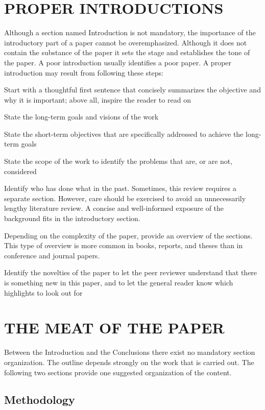 \documentclass{ICASP13Paper}
\begin{document}
\section{PROPER INTRODUCTIONS}
Although a section named Introduction is not mandatory, the importance of the 
introductory part of a paper cannot be overemphasized. Although it does not 
contain the substance of the paper it sets the stage and establishes the tone 
of the paper. A poor introduction usually identifies a poor paper. A proper 
introduction may result from following these steps:
\begin{compactenum}
  \item Start with a thoughtful first sentence that concisely summarizes the 
  objective and why it is important; above all, inspire the reader to read on
  \item State the long-term goals and visions of the work
  \item State the short-term objectives that are specifically addressed to 
  achieve the long-term goals
  \item State the scope of the work to identify the problems that are, or are 
  not, considered
  \item Identify who has done what in the past. Sometimes, this review requires 
  a separate section. However, care should be exercised to avoid an 
  unnecessarily lengthy literature review. A concise and well-informed exposure 
  of the background fits in the introductory section.
  \item Depending on the complexity of the paper, provide an overview of the 
  sections. This type of overview is more common in books, reports, and theses 
  than in conference and journal papers.
  \item Identify the novelties of the paper to let the peer reviewer understand 
  that there is something new in this paper, and to let the general reader know 
  which highlights to look out for
\end{compactenum}

\section{THE MEAT OF THE PAPER}
Between the Introduction and the Conclusions there exist no mandatory section 
organization. The outline depends strongly on the work that is carried out. The 
following two sections provide one suggested organization of the content.

\subsection{Methodology}
\end{document}
